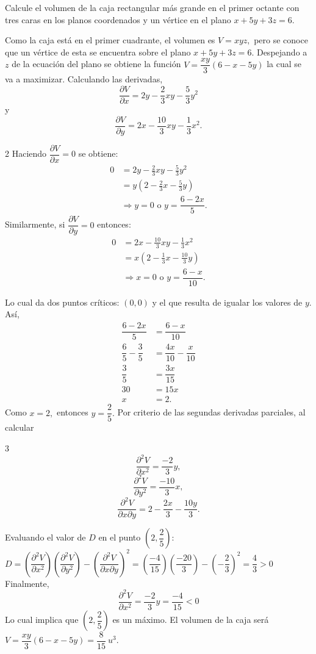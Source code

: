 \begin{prob}
Calcule el volumen de la caja rectangular más grande en el primer octante con tres caras en los planos coordenados y un vértice en el plano $x+5y+3z=6.$
\begin{myproof}
Como la caja está en el primer cuadrante, el volumen es $V=xyz,$ pero se conoce que un vértice de esta se encuentra sobre el plano $x+5y+3z=6.$ Despejando a $z$ de la ecuación del plano se obtiene la función $V=\dfrac{xy}{3}\left( 6-x-5y \right)$ la cual se va a maximizar.
Calculando las derivadas, $$\dfrac{\partial V}{\partial x}=2y-\frac{2}{3}xy-\frac{5}{3}y^2$$ y  $$\dfrac{\partial V}{\partial y}=2x-\frac{10}{3}xy-\frac{1}{3}x^2.$$
\begin{multicols}{2}
Haciendo $\dfrac{\partial V}{\partial x}=0$ se obtiene:
\begin{align*}
0&=2y-\frac{2}{3}xy-\frac{5}{3}y^2\\
&=y\left(2-\frac{2}{3}x-\frac{5}{3}y\right)\\
&\Rightarrow y=0 \text{ o } y=\dfrac{6-2x}{5}.
\end{align*}
\columnbreak
Similarmente, si $\dfrac{\partial V}{\partial y}=0$ entonces:
\begin{align*}
0&=2x-\frac{10}{3}xy-\frac{1}{3}x^2\\
&=x\left(2-\frac{1}{3}x-\frac{10}{3}y\right)\\
&\Rightarrow x=0 \text{ o } y=\dfrac{6-x}{10}.
\end{align*}
\end{multicols}
Lo cual da dos puntos críticos: $(0,0)$ y el que resulta de igualar los valores de $y.$
Así, 
\begin{align*}
\dfrac{6-2x}{5}&=\dfrac{6-x}{10}\\\dfrac{6}{5}-\dfrac{3}{5}&=\dfrac{4x}{10}-\dfrac{x}{10}\\\dfrac{3}{5}&=\dfrac{3x}{15}\\30&=15x\\x&=2.
\end{align*}
Como $x=2,$ entonces $y=\dfrac{2}{5}.$  
Por criterio de las segundas derivadas parciales, al calcular 
\begin{multicols}{3}
$$\dfrac{\partial^2 V}{\partial x^2}=\dfrac{-2}{3}y,$$ $$\dfrac{\partial^2 V}{\partial y^2}=\dfrac{-10}{3}x,$$ $$\dfrac{\partial^2 V}{\partial x\partial y}=2-\dfrac{2x}{3}-\dfrac{10y}{3}.$$
\end{multicols}
Evaluando el valor de $D$ en el punto $\left( 2,\dfrac{2}{5}  \right)$:
$D=\left(\dfrac{\partial^2 V}{\partial x^2}\right)\left(\dfrac{\partial^2 V}{\partial y^2}\right)-\left(\dfrac{\partial^2 V}{\partial x\partial y}\right)^2=\left(  \dfrac{-4}{15}  \right)\left(  \dfrac{-20}{3}  \right)-\left( -\dfrac{2}{3} \right)^2 = \dfrac{4}{3}>0$
Finalmente,  $$\dfrac{\partial^2 V}{\partial x^2}=\dfrac{-2}{3}y=\dfrac{-4}{15}<0$$
Lo cual implica que $\left( 2,\dfrac{2}{5}  \right)$ es un máximo.
El volumen de la caja será $V=\dfrac{xy}{3}\left( 6-x-5y \right)=\dfrac{8}{15}\ u^3.$
\end{myproof}
\end{prob}

